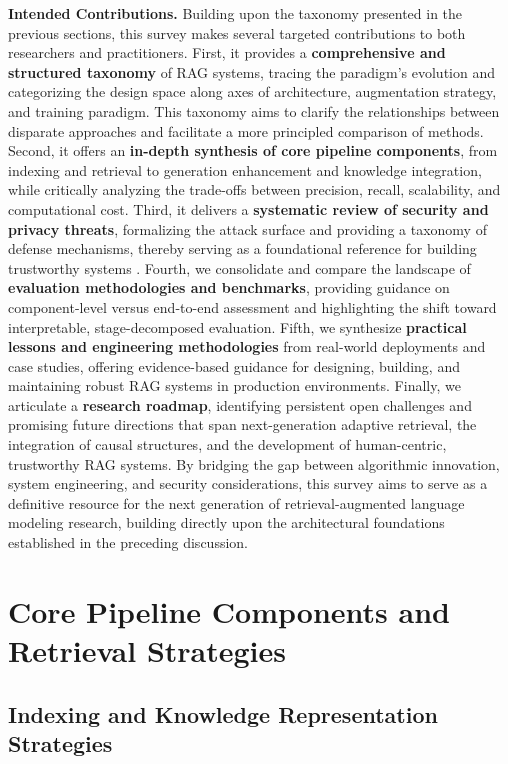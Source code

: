 \documentclass[11pt]{article}
\begin{document}
\textbf{Intended Contributions.} Building upon the taxonomy presented in the previous sections, this survey makes several targeted contributions to both researchers and practitioners. First, it provides a \textbf{comprehensive and structured taxonomy} of RAG systems, tracing the paradigm's evolution and categorizing the design space along axes of architecture, augmentation strategy, and training paradigm. This taxonomy aims to clarify the relationships between disparate approaches and facilitate a more principled comparison of methods. Second, it offers an \textbf{in-depth synthesis of core pipeline components}, from indexing and retrieval to generation enhancement and knowledge integration, while critically analyzing the trade-offs between precision, recall, scalability, and computational cost. Third, it delivers a \textbf{systematic review of security and privacy threats}, formalizing the attack surface and providing a taxonomy of defense mechanisms, thereby serving as a foundational reference for building trustworthy systems \cite{ref79}. Fourth, we consolidate and compare the landscape of \textbf{evaluation methodologies and benchmarks}, providing guidance on component-level versus end-to-end assessment and highlighting the shift toward interpretable, stage-decomposed evaluation. Fifth, we synthesize \textbf{practical lessons and engineering methodologies} from real-world deployments and case studies, offering evidence-based guidance for designing, building, and maintaining robust RAG systems in production environments. Finally, we articulate a \textbf{research roadmap}, identifying persistent open challenges and promising future directions that span next-generation adaptive retrieval, the integration of causal structures, and the development of human-centric, trustworthy RAG systems. By bridging the gap between algorithmic innovation, system engineering, and security considerations, this survey aims to serve as a definitive resource for the next generation of retrieval-augmented language modeling research, building directly upon the architectural foundations established in the preceding discussion.

\section{Core Pipeline Components and Retrieval Strategies}

\subsection{Indexing and Knowledge Representation Strategies}
\end{document}
